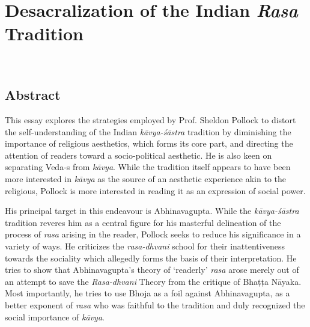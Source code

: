 \chapter[Desacralization of the Indian \textsl{Rasa} Tradition]{Desacralization of the Indian \textsl{Rasa} Tradition}\label{chapter\thechapter:begin}

~

\vskip 10pt

\section*{Abstract}

This essay explores the strategies employed by Prof. Sheldon Pollock to distort the self-understanding of the Indian \textsl{kāvya-śāstra} tradition by diminishing the importance of religious aesthetics, which forms its core part, and directing the attention of readers toward a socio-political aesthetic. He is also keen on separating Veda-s from \textsl{kāvya}. While the tradition itself appears to have been more interested in \textsl{kāvya} as the source of an aesthetic experience akin to the religious, Pollock is more interested in reading it as an expression of social power. 

His principal target in this endeavour is Abhinavagupta. While the \textsl{kāvya-śāstra} tradition reveres him as a central figure for his masterful delineation of the process of \textsl{rasa} arising in the reader, Pollock seeks to reduce his significance in a variety of ways. He criticizes the \textsl{rasa-dhvani} school for their inattentiveness towards the sociality which allegedly forms the basis of their interpretation. He tries to show that Abhinavagupta's theory of `readerly' \textsl{rasa} arose merely out of an attempt to save the \textsl{Rasa-dhvani} Theory from the critique of Bhaṭṭa Nāyaka. Most importantly, he tries to use Bhoja as a foil against Abhinavagupta, as a better exponent of \textsl{rasa} who was faithful to the tradition and duly recognized the social importance of \textsl{kāvya}. 


